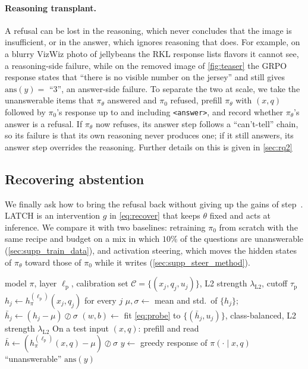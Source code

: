 \paragraph{Reasoning transplant.}
A refusal can be lost in the reasoning, which never concludes that the image is
insufficient, or in the answer, which ignores reasoning that does. For example, on a blurry VizWiz photo
of jellybeans the RKL response lists flavors it cannot see, a reasoning-side failure, while
on the removed image of \cref{fig:teaser} the GRPO response states that ``there is no
visible number on the jersey'' and still gives $\mathrm{ans}(y) = $ ``3'', an answer-side failure. To separate the two at scale, we
take the unanswerable items that $\pi_\theta$ answered and $\pi_0$ refused, prefill
$\pi_\theta$ with $(x, q)$ followed by $\pi_0$'s response up to and including
\texttt{<answer>}, and record whether $\pi_\theta$'s answer is a refusal. If $\pi_\theta$
now refuses, its answer step follows a ``can't-tell'' chain, so its failure is that its own
reasoning never produces one; if it still answers, its answer step overrides the reasoning. Further details on this is given in \cref{sec:rq2}

\subsection{Recovering abstention}
\label{sec:method-remedies}

We finally ask how to bring the refusal back without giving up the gains of
step~. LATCH is an intervention $g$ in \cref{eq:recover} that keeps $\theta$ fixed
and acts at inference. We compare it with two baselines: retraining $\pi_0$ from scratch
with the same recipe and budget on a mix in which $10\%$ of the questions are unanswerable
(\cref{sec:supp_train_data}), and activation steering, which moves the hidden states of
$\pi_\theta$ toward those of $\pi_0$ while it writes (\cref{sec:supp_steer_method}).

\begin{algorithm}[t]
\caption{\textbf{LATCH: one linear read of the prompt replaces an answer by a
refusal.} Lines 1--3 run once per model; lines 4--8 add no forward pass.}
\label{alg:latch}
\begin{algorithmic}[1]
\Require model $\pi$, layer $\ell_{\mathrm{p}}$, calibration set
  $\mathcal{C} = \{(x_j, q_j, u_j)\}$, L2 strength $\lambda_{\mathrm{L2}}$, cutoff
  $\tau_{\mathrm{p}}$
\State $h_j \gets h^{(\ell_{\mathrm{p}})}_{\pi}(x_j, q_j)$ for every
  $j$ 
\State $\mu, \sigma \gets$ mean and std.\ of $\{h_j\}$;
  $\bar{h}_j \gets (h_j - \mu) \oslash \sigma$
\State $(w, b) \gets$ fit \cref{eq:probe} to $\{(\bar{h}_j, u_j)\}$, class-balanced, L2
  strength $\lambda_{\mathrm{L2}}$
\State On a test input $(x, q)$: prefill and read
  $\bar{h} \gets (h^{(\ell_{\mathrm{p}})}_{\pi}(x, q) - \mu) \oslash \sigma$
\State $y \gets$ greedy response of $\pi(\cdot \mid x, q)$ 
  \State \Return ``unanswerable''
\EndIf
\State \Return $\mathrm{ans}(y)$
\end{algorithmic}
\end{algorithm}

